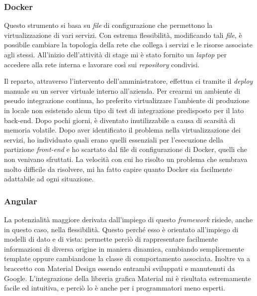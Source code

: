 \subsubsection{Docker}
\label{ssec:docker}
Questo strumento si basa su \textit{file} di configurazione che permettono la virtualizzazione di vari servizi. Con estrema flessibilità, modificando tali \textit{file}, è possibile cambiare la topologia della rete che collega i servizi e le risorse associate agli stessi. All'inizio dell'attività di stage mi è stato fornito un \textit{laptop} per accedere alla rete interna e lavorare così sui \textit{repository} condivisi.

Il reparto, attraverso l'intervento dell'amministratore, effettua \acrshort{ci} tramite il \textit{deploy} manuale su un server virtuale interno all'azienda. Per crearmi un ambiente di pseudo integrazione continua, ho preferito virtualizzare l'ambiente di produzione in locale non esistendo alcun tipo di test di integrazione predisposto per il lato back-end. Dopo pochi giorni, è diventato inutilizzabile a causa di scarsità di memoria volatile. Dopo aver identificato il problema nella virtualizzazione dei servizi, ho individuato quali erano quelli essenziali per l'esecuzione della partizione \textit{front-end} e ho scartato dal file di configurazione di Docker, quelli che non venivano sfruttati.
La velocità con cui ho risolto un problema che sembrava molto difficile da risolvere, mi ha fatto capire quanto Docker sia facilmente adattabile ad ogni situazione.
\newpage
\subsubsection{Angular}
La potenzialità maggiore derivata dall'impiego di questo \textit{framework} risiede, anche in questo caso, nella flessibilità. Questo perché esso è orientato all'impiego di modelli di dato e di vista: permette perciò di rappresentare facilmente informazioni di diversa origine in maniera dinamica, cambiando semplicemente template oppure cambiandone la classe di comportamento associata.
Inoltre va a braccetto con Material Design essendo entrambi sviluppati e manutenuti da Google. L'integrazione della libreria grafica Material mi è risultata estremamente facile ed intuitiva, e perciò lo è anche per i programmatori meno esperti.

